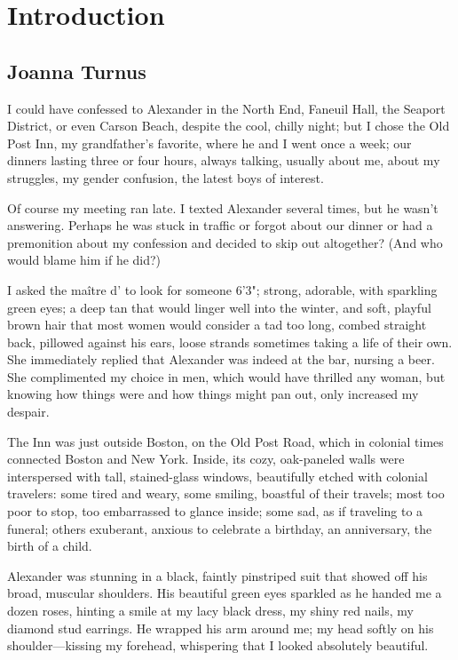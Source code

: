 \part*{Introduction}

\chapter*{Joanna Turnus}

\titlemark

I could have confessed to Alexander in the North End, Faneuil Hall, the
Seaport District, or even Carson Beach, despite the cool, chilly night;
but I chose the Old Post Inn, my grandfather's favorite, where he and I
went once a week; our dinners lasting three or four hours, always
talking, usually about me, about my struggles, my gender confusion, the
latest boys of interest.

Of course my meeting ran late. I texted Alexander several times, but he
wasn't answering. Perhaps he was stuck in traffic or forgot about our
dinner or had a premonition about my confession and decided to skip out
altogether? (And who would blame him if he did?)

I asked the maître d' to look for someone 6'3"; strong, adorable, with
sparkling green eyes; a deep tan that would linger well into the winter,
and soft, playful brown hair that most women would consider a tad too
long, combed straight back, pillowed against his ears, loose strands
sometimes taking a life of their own. She immediately replied that
Alexander was indeed at the bar, nursing a beer. She complimented my
choice in men, which would have thrilled any woman, but knowing how
things were and how things might pan out, only increased my despair.

The Inn was just outside Boston, on the Old Post Road, which in colonial
times connected Boston and New York. Inside, its cozy, oak-paneled walls
were interspersed with tall, stained-glass windows, beautifully etched
with colonial travelers: some tired and weary, some smiling, boastful of
their travels; most too poor to stop, too embarrassed to glance inside;
some sad, as if traveling to a funeral; others exuberant, anxious to
celebrate a birthday, an anniversary, the birth of a child.

Alexander was stunning in a black, faintly pinstriped suit that showed
off his broad, muscular shoulders. His beautiful green eyes sparkled as
he handed me a dozen roses, hinting a smile at my lacy black dress, my
shiny red nails, my diamond stud earrings. He wrapped his arm around me;
my head softly on his shoulder---kissing my forehead, whispering that I
looked absolutely beautiful.

